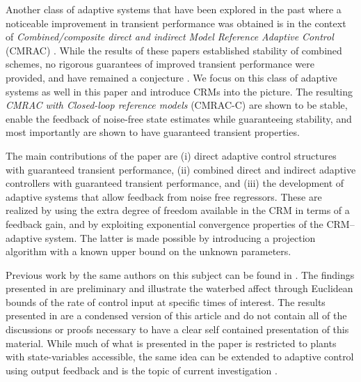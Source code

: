\documentclass[10pt,journal]{IEEEtran}
\theoremstyle{plain}%
\theoremstyle{definition}
\begin{document}
Another class of adaptive systems that have been explored in the past where a noticeable improvement in transient performance was obtained is in the context of {\em Combined/composite direct and indirect Model Reference Adaptive Control} (CMRAC) \cite{duarte1989combined,slotine1989composite}. While the results of these papers established stability of combined schemes, no rigorous guarantees of improved transient performance were provided, and have remained a conjecture \cite{eugeneTAC09}.  We focus on this class of adaptive systems as well in this paper and introduce CRMs into the picture. The resulting {\em CMRAC with Closed-loop reference models} (CMRAC-C) are shown to be stable, enable the feedback of noise-free state estimates while guaranteeing stability, and most importantly are shown to have guaranteed transient properties. 






The main contributions of the paper are (i) direct adaptive control structures with guaranteed transient performance, (ii) combined direct and indirect adaptive controllers with guaranteed transient performance, and (iii) the development of adaptive systems that allow feedback from noise free regressors. These are realized by using the extra degree of freedom available in the CRM in terms of a feedback gain, and by exploiting exponential convergence properties of the CRM--adaptive system. The latter is made possible by introducing a projection algorithm with a known upper bound on the unknown parameters. 

Previous work by the same authors on this subject can be found in \cite{gib12,gib13acc1,gib13acc2}. The findings presented in   \cite{gib12} are preliminary and illustrate the waterbed affect through Euclidean bounds of the rate of control input at specific times of interest. The results presented in \cite{gib13acc1,gib13acc2} are a condensed version of this article and do not contain all of the discussions or proofs necessary to have a clear self contained presentation of this material. While much of what is presented in the paper is restricted to plants with state-variables accessible, the same idea can be extended to adaptive control using output feedback and is the topic of current investigation \cite{gib13ecc}. 
\end{document}
